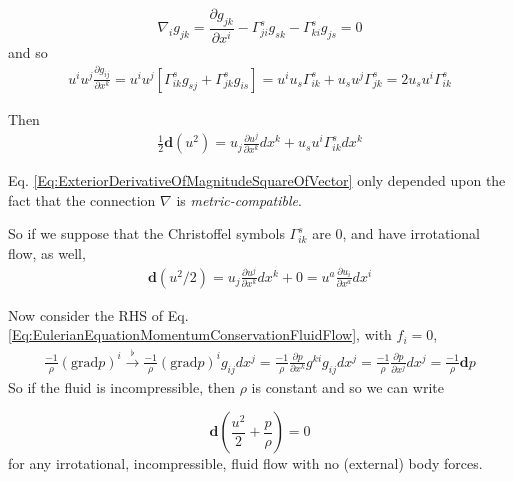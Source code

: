 \documentclass[10pt]{amsart}
\begin{document}
\begin{multicols*}{2}
\begin{equation}
\nabla_i g_{jk} = \frac{ \partial g_{jk}}{\partial x^i} - \Gamma^s_{ji} g_{sk} - \Gamma^s_{ki} g_{js} = 0
\end{equation}
and so
\begin{equation}
\begin{gathered}
 u^i u^j \frac{ \partial g_{ij}}{\partial x^k} = u^i u^j \left[ \Gamma^s_{ik} g_{sj} + \Gamma^s_{jk} g_{is} \right] = u^i u_s \Gamma^s_{ik} + u_s u^j \Gamma^s_{jk} = 2u_s u^i \Gamma^s_{ik}
\end{gathered}
\end{equation}


Then 
\begin{equation}\label{Eq:ExteriorDerivativeOfMagnitudeSquareOfVector}
\begin{gathered}
\frac{1}{2} \mathbf{d}(u^2) = u_j \frac{ \partial u^j}{\partial x^k} dx^k + u_s u^i \Gamma^s_{ik} dx^k
\end{gathered}
\end{equation}

Eq. \ref{Eq:ExteriorDerivativeOfMagnitudeSquareOfVector} only depended upon the fact that the connection $\nabla$ is \emph{metric-compatible}.

So if we suppose that the Christoffel symbols $\Gamma^s_{ik}$ are 0, and have irrotational flow, as well,
\[
\begin{gathered}
\mathbf{d}(u^2 / 2) = u_j \frac{\partial u^j}{ \partial x^k} dx^k  + 0 = u^a \frac{ \partial u_i}{\partial x^a} dx^i 
\end{gathered}
\]

Now consider the RHS of Eq. \ref{Eq:EulerianEquationMomentumConservationFluidFlow}, with $f_i =0$,
\[
\begin{gathered}
	\frac{-1}{\rho} (\text{grad}{p})^i \xrightarrow{ \flat} \frac{-1}{\rho} (\text{grad}p)^i g_{ij} dx^j = \frac{-1}{\rho}  \frac{\partial p}{\partial x^k} g^{ki} g_{ij} dx^j = \frac{-1}{\rho} \frac{ \partial p}{\partial x^j} dx^j = \frac{-1}{\rho} \mathbf{d}p
\end{gathered}
\]
So if the fluid is incompressible, then $\rho$ is constant and so we can write

\begin{equation}
\mathbf{d} \left( \frac{u^2}{2} + \frac{p}{\rho} \right) = 0 
\end{equation}
for any irrotational, incompressible, fluid flow with no (external) body forces.


\end{multicols*}
\end{document}
